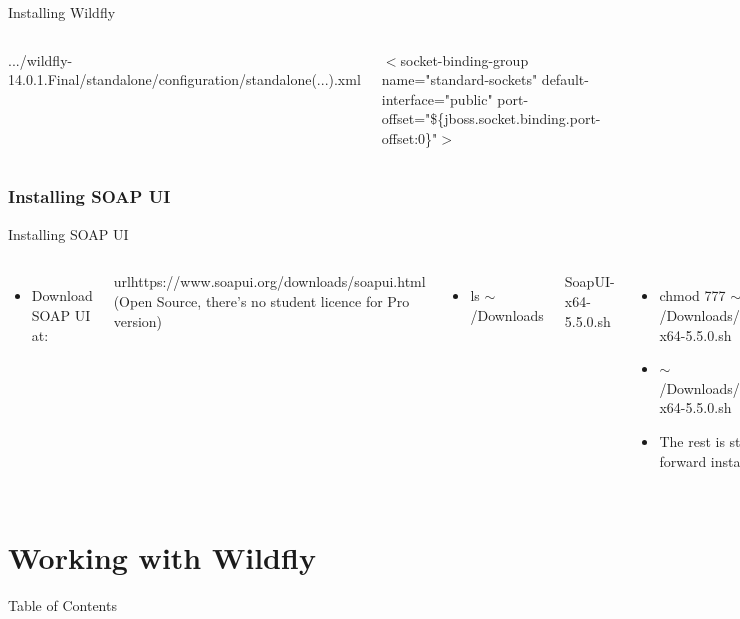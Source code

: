 \documentclass[aspectratio=1610,english]{beamer} %
\begin{document}
\begin{frame}{Installing Wildfly}
\begin{columns}
\begin{minipage}{\textwidth}
					\raggedright{
					.../wildfly-14.0.1.Final/standalone/configuration/standalone(...).xml 
					}
					\hfil \break
				\end{minipage}
				
				\begin{minipage}{\textwidth}
					
					\raggedright{ $<$socket-binding-group name="standard-sockets" default-interface="public" port-offset="\$\{jboss.socket.binding.port-offset:0\}"$>$ }
					\hfil \break
				\end{minipage}	
		\end{columns}
	\end{frame}
	\section{Installing SOAP UI}
	\begin{frame}{Installing SOAP UI}
		\begin{columns}
				\begin{itemize}
					\small
					\color{black}
					\item Download SOAP UI at:
				\end{itemize}
				\tiny
				url{https://www.soapui.org/downloads/soapui.html} \\
				(Open Source, there's no student licence for Pro version)
				\begin{itemize}
					\small
					\color{black}
					\item ls $\sim$/Downloads
				\end{itemize}
				\tiny
				SoapUI-x64-5.5.0.sh
				\begin{itemize}
					\small
					\color{black}
					\item chmod 777 $\sim$/Downloads/SoapUI-x64-5.5.0.sh
					\item $\sim$/Downloads/SoapUI-x64-5.5.0.sh
					\item The rest is straight forward installation
				\end{itemize}
				\tiny
				Next -$>$ Next -$>$ Finish
		\end{columns}
	\end{frame}
	\part{Working with Wildfly}
  	\begin{frame}{Table of Contents}
  		\tableofcontents
  	\end{frame}
\end{document}
